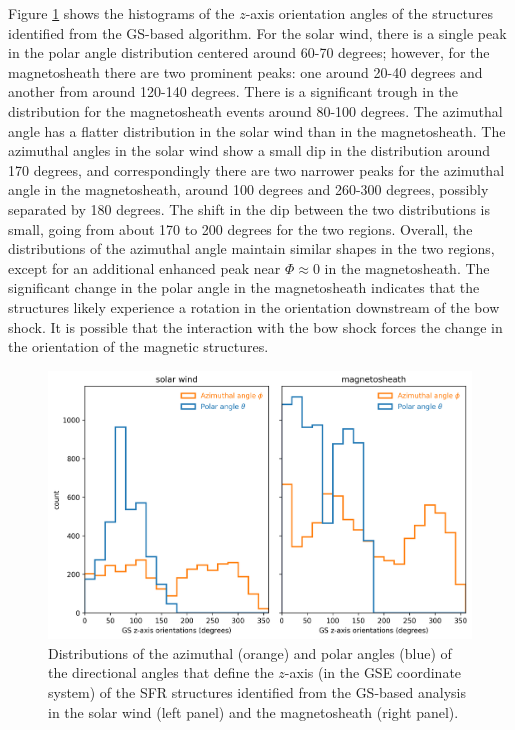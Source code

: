 Figure \ref{fig:histogram-orientation} shows the histograms of the $z$-axis orientation angles of the structures identified from the GS-based algorithm. For the solar wind, there is a single peak in the polar angle distribution centered around 60-70 degrees; however, for the magnetosheath there are two prominent peaks: one around 20-40 degrees and another from around 120-140 degrees. There is a significant trough in the distribution for the magnetosheath events around 80-100 degrees. The azimuthal angle has a flatter distribution in the solar wind than in the magnetosheath. The azimuthal angles in the solar wind show a small dip in the distribution around 170 degrees, and correspondingly there are two narrower peaks for the azimuthal angle in the magnetosheath, around 100 degrees and 260-300 degrees, possibly separated by 180 degrees. The shift in the dip between the two distributions is small, going from about 170 to 200 degrees for the two regions. Overall, the distributions of the azimuthal angle maintain similar shapes in the two regions, except for an additional enhanced peak near $\Phi\approx 0$ in the magnetosheath. The significant change in the polar angle in the magnetosheath indicates that the structures likely experience a rotation in the orientation downstream of the bow shock. It is possible that the interaction with the bow shock forces the change in the orientation of the magnetic structures.

\begin{figure}
    \centering
    \includegraphics[width=\textwidth]{Figures/Histograms/histogram_orientation.png}
    \caption[Distributions of the azimuthal  and polar angles that define the $z$-axis of SFR structures]{Distributions of the azimuthal (orange) and polar angles (blue) of the directional angles that define the $z$-axis (in the GSE coordinate system) of the SFR structures identified from the GS-based analysis in the solar wind (left panel) and the magnetosheath (right panel).}
    \label{fig:histogram-orientation}
\end{figure}